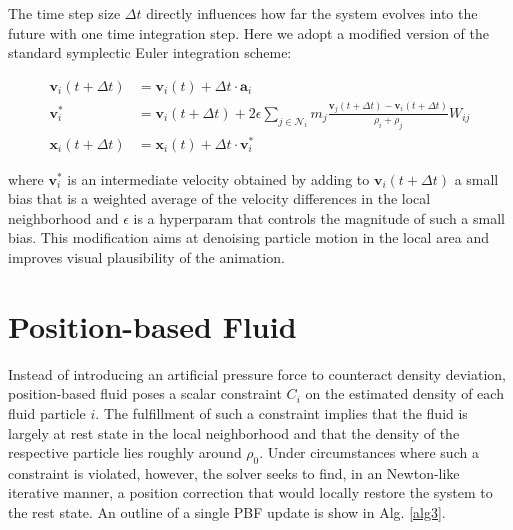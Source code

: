 \documentclass[
	11pt, 
	DIV10,
	ngerman,
	a4paper, 
	oneside, 
	headings=normal, 
	captions=tableheading,
	final, 
	numbers=noenddot
]{scrartcl}
\begin{document}
The time step size $ \Delta t $ directly influences how far the system evolves into the future with one time integration step. Here we adopt a modified version of the standard symplectic Euler integration scheme:

\begin{equation}
	\label{eq18}
	\begin{split}
		\mathbf{v}_{i}(t + \Delta t) &= \mathbf{v}_{i}(t) + \Delta t \cdot \mathbf{a}_{i} \\[1em]
		\mathbf{v}_{i}^{*} &= \mathbf{v}_{i}(t + \Delta t) + 2\epsilon \sum_{j \in \mathcal{N}_{i}} m_{j} \frac{\mathbf{v}_{j}(t + \Delta t) - \mathbf{v}_{i}(t + \Delta t)}{\rho_{i} + \rho_{j}} W_{ij} \\[1em]
		\mathbf{x}_{i}(t + \Delta t) &= \mathbf{x}_{i}(t) + \Delta t \cdot \mathbf{v}_{i}^{*}
	\end{split}
\end{equation}

where $ \mathbf{v}_{i}^{*} $ is an intermediate velocity obtained by adding to $ \mathbf{v}_{i}(t + \Delta t) $ a small bias that is a weighted average of the velocity differences in the local neighborhood and $ \epsilon $ is a hyperparam that controls the magnitude of such a small bias. This modification aims at denoising particle motion in the local area and improves visual plausibility of the animation.

\section{Position-based Fluid}
\label{sec3}

Instead of introducing an artificial pressure force to counteract density deviation, position-based fluid poses a scalar constraint $ C_{i} $ on the estimated density of each fluid particle $ i $. The fulfillment of such a constraint implies that the fluid is largely at rest state in the local neighborhood and that the density of the respective particle lies roughly around $ \rho_{0} $. Under circumstances where such a constraint is violated, however, the solver seeks to find, in an Newton-like iterative manner, a position correction that would locally restore the system to the rest state. An outline of a single PBF update is show in Alg. \ref{alg3}.
\end{document}
